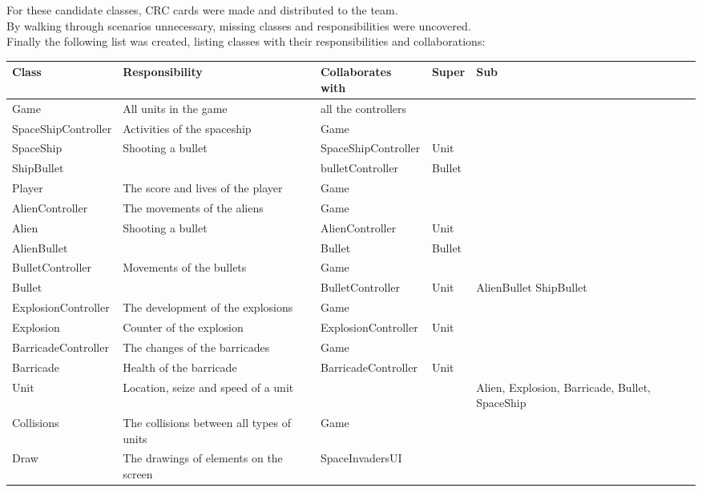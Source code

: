 \documentclass[10pt]{article}
\begin{document}
 \pagebreak
For these candidate classes, CRC cards were made and distributed to the team. \\
By walking through scenarios unnecessary, missing classes and responsibilities were uncovered.\\
Finally the following list was created, listing classes with their responsibilities and collaborations:
\begin{center}
   \hspace*{-0.75in}\begin{tabular}{ | p{3cm} | p{5cm} | p{3cm} | p{2cm} | p{2cm} |}
  \hline
    Class & Responsibility & Collaborates with & Super & Sub \\ \hline
   Game & All units in the game & all the controllers & & \\ \hline
   SpaceShipController & Activities of the spaceship & Game & & \\ \hline
  SpaceShip & Shooting a bullet & SpaceShipController & Unit & \\ \hline
  ShipBullet& & bulletController & Bullet & \\ \hline
   Player & The score and lives of the player & Game & & \\ \hline
  AlienController & The movements of the aliens & Game & &  \\  \hline
   Alien & Shooting a bullet  & AlienController & Unit &  \\  \hline
   AlienBullet & & Bullet & Bullet &  \\  \hline
   BulletController & Movements of the bullets & Game & &  \\  \hline
   Bullet & &  BulletController & Unit & AlienBullet ShipBullet \\  \hline
   ExplosionController & The development of the explosions & Game & &  \\  \hline
  Explosion & Counter of the explosion & ExplosionController & Unit &  \\  \hline
  BarricadeController & The changes of the barricades & Game & &  \\  \hline
  Barricade & Health of the barricade & BarricadeController & Unit &  \\  \hline
  Unit & Location, seize and speed of a unit &  & & Alien, Explosion, Barricade, Bullet, SpaceShip  \\  \hline
  Collisions & The collisions between all types of units  & Game & &  \\  \hline
  Draw  & The drawings of elements on the screen & SpaceInvadersUI & &  \\  \hline

\end{tabular}
\end{center}
\end{document}
